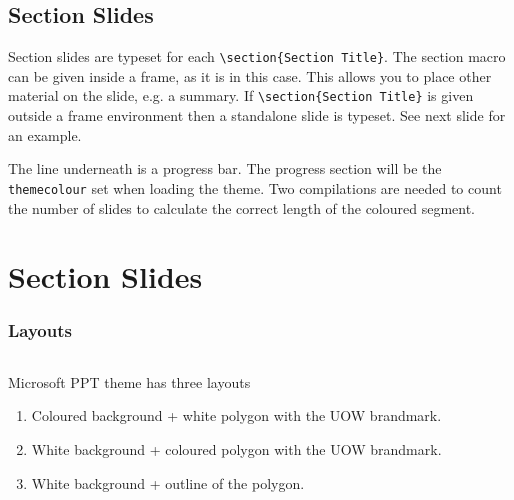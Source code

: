 \documentclass[aspectratio=169]{beamer}
\newcommand{\command}[1]{\texttt{\color{UOWdarkgreen}#1}}
\begin{document}
\begin{frame}
\section{Section Slides}
Section slides are typeset for each \command{\textbackslash{}section\{Section Title\}}. The section macro can be given inside a frame, as it is in this case. This allows you to place other material on the slide, e.g. a summary. If \command{\textbackslash{}section\{Section Title\}} is given outside a frame environment then a standalone slide is typeset. See next slide for an example. 

The line underneath is a progress bar. The progress section will be the \texttt{themecolour} set when loading the theme. Two compilations are needed to count the number of slides to calculate the correct length of the coloured segment.
\end{frame}


\section{Section Slides}


\begin{frame}
\frametitle{Layouts}
\begin{columns}[T]
\begin{column}{0.47\textwidth}
Microsoft PPT theme has three layouts
\begin{enumerate}
   \item Coloured background + white polygon with the UOW brandmark.
   \item White background + coloured polygon with the UOW brandmark.
   \item White background + outline of the polygon.
\end{enumerate}
\end{column}
\end{columns}
\end{frame}
\end{document}
